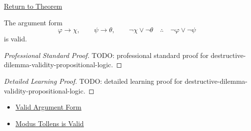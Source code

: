\newpage
{}
\label{prf:destructive-dilemma-validity-propositional-logic}

\begin{remark*}[Return]
\hyperref[thm:destructive-dilemma-validity-propositional-logic]{Return to Theorem}
\end{remark*}

\begin{theorem*}
The argument form
\[
\varphi\to\chi,\qquad \psi\to\theta,\qquad \neg\chi\lor\neg\theta
\quad\therefore\quad
\neg\varphi\lor\neg\psi
\]
is valid.
\end{theorem*}

\begin{proof}[Professional Standard Proof]
\LRAProofBodyStart
TODO: professional standard proof for destructive-dilemma-validity-propositional-logic.
\end{proof}

\begin{proof}[Detailed Learning Proof]
\LRAProofBodyStart
TODO: detailed learning proof for destructive-dilemma-validity-propositional-logic.
\end{proof}

\begin{remark*}
\end{remark*}

\begin{dependencies}
\begin{itemize}
  \item \hyperref[def:valid-argument-form-propositional-logic]{Valid Argument Form}
  \item \hyperref[thm:modus-tollens-validity-propositional-logic]{Modus Tollens is Valid}
\end{itemize}
\end{dependencies}

\clearpage
